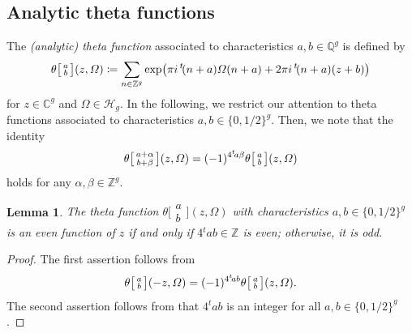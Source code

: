 \documentclass{amsart}
\theoremstyle{definition}
\theoremstyle{plain}
\newtheorem{Lem}[Def]{Lemma}
\begin{document}
\subsection{Analytic theta functions}\label{theta}
The \emph{({analytic}) theta function} associated to characteristics $a,b \in \mathbb{Q}^g$ is defined by
\[
    \theta\bigl[\begin{smallmatrix}a\\b\end{smallmatrix}\bigr](z,\varOmega) \coloneqq \sum_{n \in \mathbb{Z}^g} \exp\bigl(\pi i{\,}^t\!(n+a)\varOmega(n+a)+ 2\pi i{\,}^t\!(n+a)(z+b)\bigr)\smallskip
\]
for $z \in \mathbb{C}^g$ and $\varOmega \in \mathcal{H}_g$.
In the following, we restrict our attention to theta functions associated to characteristics $a,b \in \{0,1/2\}^g$.
Then, we note that the identity
\[
    \theta\bigl[\begin{smallmatrix}a+\alpha\\b+\beta\end{smallmatrix}\bigr](z,\varOmega) = (-1)^{4{}^t\!a\beta}\theta\bigl[\begin{smallmatrix}a\\b\end{smallmatrix}\bigr](z,\varOmega)\smallskip
\]
holds for any $\alpha, \beta \in \mathbb{Z}^g$.
\begin{Lem}\label{even-odd}
The theta function $\theta\bigl[\begin{smallmatrix}a\\b\end{smallmatrix}\bigr](z,\varOmega)$ with characteristics $a,b \in \{0,1/2\}^g$ is an even function of $z$ if and only if $4{}^t\!ab \in \mathbb{Z}$ is even; otherwise, it is odd.
\end{Lem}
\begin{proof}
The first assertion follows from\vspace{-0.5mm}
\[
    \theta\bigl[\begin{smallmatrix}a\\b\end{smallmatrix}\bigr](-z,\varOmega) = (-1)^{4{}^t\!ab}\theta\bigl[\begin{smallmatrix}a\\b\end{smallmatrix}\bigr](z,\varOmega).\smallskip
\]
The second assertion follows from that $4{}^t\!ab$ is an integer for all $a,b \in \{0,1/2\}^g$.
\end{proof}\smallskip
\end{document}
